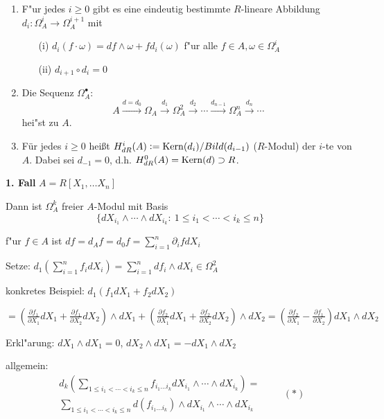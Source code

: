 \documentclass[a4paper, 10pt]{report}
\begin{document}
\begin{SatzDef}
\begin{enumerate}
\item F"ur jedes $i \geq 0$ gibt es eine eindeutig bestimmte $R$-lineare Abbildung $d_i : \Omega^i_A \rightarrow \Omega^{i+1}_A$ mit
\begin{enumerate}
\item[(i)] $d_i(f \cdot \omega) = df \wedge \omega + f d_i(\omega)$ f"ur alle $f \in A, \omega \in \Omega^i_A$
\item[(ii)] $d_{i+1} \circ d_i = 0$
\end{enumerate}

\item
Die Sequenz $\Omega^\bullet_A$:
$$A \overset{d=d_0}{\longrightarrow} \Omega_A \overset{d_1}{\rightarrow} \Omega^2_A \overset{d_2}{\rightarrow} \cdots \overset{d_{n-1}}{\rightarrow} \Omega^n_A  \overset{d_n}{\rightarrow} \cdots$$
hei"st  zu $A$.

\item
F\"ur jedes $i\geq 0$ hei\ss t $H_{dR}^i(A)\mathrel{\mathop:}=
\mathrm{Kern}(d_i)/Bild(d_{i-1})$ ($R$-Modul)
der $i$-te  von $A$. Dabei sei $d_{-1}=0$, d.h.
$H_{dR}^0(A)=\mathrm{Kern}(d)\supset R$.

\end{enumerate}

\begin{Bew}
\textbf{1. Fall} $A = R[X_1, \ldots X_n]$

Dann ist $\Omega^k_A$ freier $A$-Modul mit Basis
\[
\{d X_{i_1} \wedge \cdots \wedge d X_{i_k}:\ 1 \leq i_1 < \cdots < i_k \leq n\}
\]

f"ur $f \in A$ ist $df = d_A f = d_0 f = \sum_{i=1}^n \partial_i f d X_i$

Setze: $d_1(\sum_{i=1}^n f_i d X_i) = \sum_{i=1}^n d f_i \wedge d X_i \in \Omega^2_A$

konkretes Beispiel: $d_1(f_1 dX_1 + f_2 dX_2)$

$= (\frac{\partial f_1}{\partial X_1} dX_1 + \frac{\partial f_1}{\partial X_2} dX_2) \wedge dX_1 + (\frac{\partial f_2}{\partial X_1} dX_1 + \frac{\partial f_2}{\partial X_2} dX_2) \wedge dX_2 = (\frac{\partial f_2}{\partial X_1} - \frac{\partial f_1}{\partial X_2}) dX_1 \wedge dX_2$

Erkl"arung: $dX_1 \wedge dX_1 = 0$, $dX_2 \wedge dX_1 = - dX_1 \wedge dX_2$

allgemein:
\begin{equation*}
\begin{split}
 d_k(\displaystyle\sum_{1 \leq i_1 < \cdots < i_k \leq n} f_{i_1 \ldots i_k}
dX_{i_1} \wedge \cdots \wedge dX_{i_k}) =\\
\sum_{1 \leq i_1 < \cdots < i_k \leq n} d(f_{i_1 \ldots i_k}) \wedge dX_{i_1}
\wedge \cdots \wedge dX_{i_k} 
\end{split}
\qquad (\ast)
\end{equation*}


\end{Bew}
\end{SatzDef}
\end{document}
